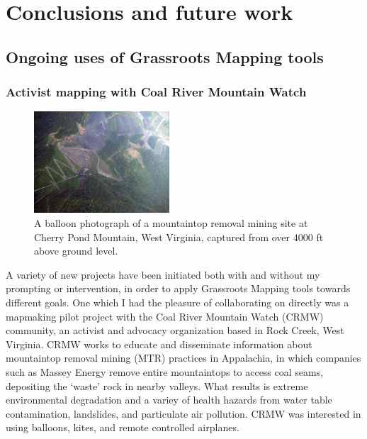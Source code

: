 \documentclass[11pt,oneside,notitlepage]{report}
\begin{document}
{{\chapter{Conclusions and future work}

\section{Ongoing uses of Grassroots Mapping tools}
\label{sec:ongoinguses}

\subsection{Activist mapping with Coal River Mountain Watch}
\label{subsec:crmw}

\begin{figure}
	\begin{flushright}
		\includegraphics[width=0.45\textwidth]{images/marsh-fork-cherry-pond.jpg}
		\caption{A balloon photograph of a mountaintop removal mining site at Cherry Pond Mountain, West Virginia, captured from over 4000 ft above ground level.}
	\end{flushright}
\end{figure}

A variety of new projects have been initiated both with and without my prompting or intervention, in order to apply Grassroots Mapping tools towards different goals. One which I had the pleasure of collaborating on directly was a mapmaking pilot project with the Coal River Mountain Watch (CRMW) community, an activist and advocacy organization based in Rock Creek, West Virginia. CRMW works to educate and disseminate information about mountaintop removal mining (MTR) practices in Appalachia, in which companies such as Massey Energy remove entire mountaintops to access coal seams, depositing the `waste' rock in nearby valleys. What results is extreme environmental degradation and a variey of health hazards from water table contamination, landslides, and particulate air pollution. CRMW was interested in using balloons, kites, and remote controlled airplanes. 

}}
\end{document}
